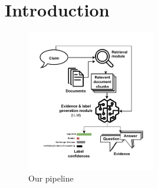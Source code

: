 
\section{Introduction}
\label{sec:introduction}

\begin{figure}[h]
    \centering
    \includegraphics[width=0.5\textwidth]{figures/pipeline.pdf}
    \caption{Our pipeline}
    \label{fig:pipeline}
\end{figure}

